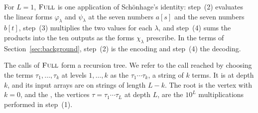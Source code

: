 For $L=1$, $\textnormal{\textsc{Full}}$ is one application of Sch\"onhage's identity: step~(2) evaluates the linear forms $\varphi_\lambda$ and $\psi_\lambda$ at the seven numbers $a[s]$ and the seven numbers $b[t]$, step~(3) multiplies the two values for each $\lambda$, and step~(4) sums the products into the ten outputs as the forms $\chi_\lambda$ prescribe. In the terms of Section~\ref{sec:background}, step~(2) is the encoding and step~(4) the decoding.

The calls of $\textnormal{\textsc{Full}}$ form a recursion tree. We refer to the call reached by choosing the terms $\tau_1,\dots,\tau_k$ at levels $1,\dots,k$ as the  $\tau_1\cdots\tau_k$, a string of $k$ terms. It is at depth $k$, and its input arrays are on strings of length $L-k$. The root is the vertex with $k=0$, and the , the vertices $\tau=\tau_1\cdots\tau_L$ at depth $L$, are the $10^L$ multiplications performed in step~(1).


